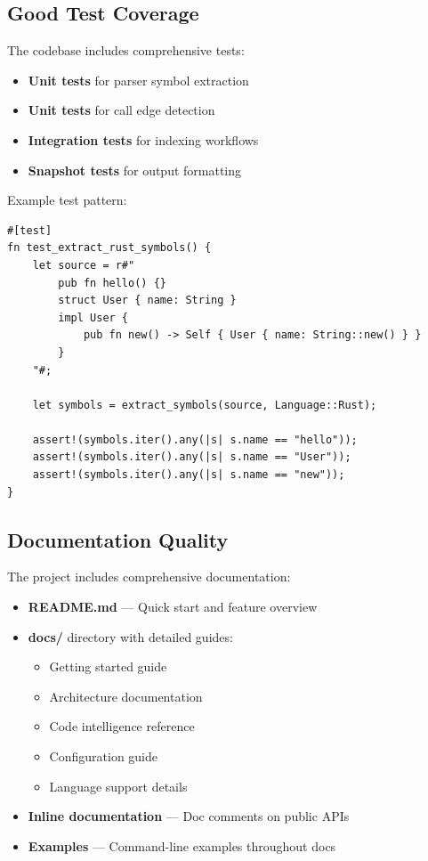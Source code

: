 \subsection{Good Test Coverage}

The codebase includes comprehensive tests:

\begin{itemize}
    \item \textbf{Unit tests} for parser symbol extraction
    \item \textbf{Unit tests} for call edge detection
    \item \textbf{Integration tests} for indexing workflows
    \item \textbf{Snapshot tests} for output formatting
\end{itemize}

Example test pattern:

\begin{lstlisting}[style=rustcode, caption={Parser test example}]
#[test]
fn test_extract_rust_symbols() {
    let source = r#"
        pub fn hello() {}
        struct User { name: String }
        impl User {
            pub fn new() -> Self { User { name: String::new() } }
        }
    "#;
    
    let symbols = extract_symbols(source, Language::Rust);
    
    assert!(symbols.iter().any(|s| s.name == "hello"));
    assert!(symbols.iter().any(|s| s.name == "User"));
    assert!(symbols.iter().any(|s| s.name == "new"));
}
\end{lstlisting}

\subsection{Documentation Quality}

The project includes comprehensive documentation:

\begin{itemize}
    \item \textbf{README.md} --- Quick start and feature overview
    \item \textbf{docs/} directory with detailed guides:
    \begin{itemize}
        \item Getting started guide
        \item Architecture documentation
        \item Code intelligence reference
        \item Configuration guide
        \item Language support details
    \end{itemize}
    \item \textbf{Inline documentation} --- Doc comments on public APIs
    \item \textbf{Examples} --- Command-line examples throughout docs
\end{itemize}
